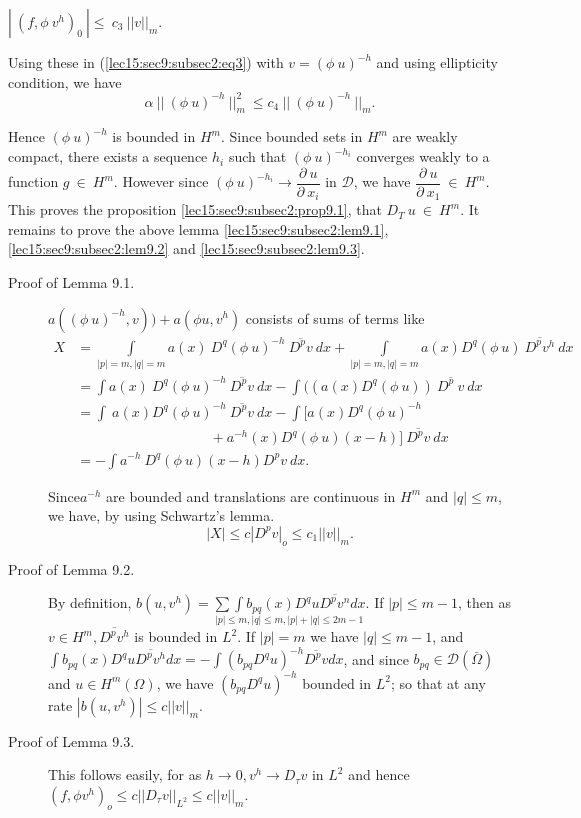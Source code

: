 \begin{lemma}\label{lec15:sec9:subsec2:lem9.3}%
  $| ~ (f, \phi ~ v^h)_0 ~ |\leq ~ c_3 ~ || v ||_m$.
\end{lemma} 

 Using these in (\ref{lec15:sec9:subsec2:eq3}) with  $v = ( \phi ~ u)^{-h}$ and using
 ellipticity condition, we have 
 $$
 \alpha ~ || ~ (\phi ~ u)^{-h} ~ ||^2_m ~ \le c_4 ~ || ~ (\phi ~ u)^{-h} ~ ||_m.
 $$
 
Hence $(\phi ~ u)^{-h}$  is bounded in $H^m$. Since bounded sets in
$H^m$ are weakly compact, there exists a sequence $h_i$ such that
$(\phi ~ u)^{-h_i}$ converges weakly to a function $g ~ \in ~
H^m$. However since $(\phi ~ u)^{-h_i} \rightarrow \dfrac{\partial ~
  u}{ \partial ~ x_i}$ in $\mathscr{D}$, we have $\dfrac{\partial ~
  u}{\partial ~ x_1} ~ \in  ~ H^m$. This proves the
proposition \ref{lec15:sec9:subsec2:prop9.1}, that $D_T ~ u ~ \in ~ H^m$. It remains to
prove the above lemma \ref{lec15:sec9:subsec2:lem9.1}, \ref{lec15:sec9:subsec2:lem9.2} 
and \ref{lec15:sec9:subsec2:lem9.3}.   

\begin{description}
  \item [Proof of Lemma 9.1.]%
  $a((\phi ~ u)^{-h}, v)) + a(\phi u , v^h)$ consists of sums of terms like
  \begin{align*}
    X & = \int\limits_{|p|=m,|q|=m}a(x) ~ D^q(\phi ~ u)^{-h} ~
    \overline{D^p v} ~ dx + \int\limits_{|p| = m, |q| = m} a(x)D^q(\phi ~
    u) ~ \overline{D^p v^h} ~  dx\\ 
    & = \int a(x) ~ D^q(\phi ~ u)^{-h} ~ \overline{D^p v} ~ dx -
    \int((a(x)D^q (\phi ~ u)) ~ \overline{D^p ~ v} ~ dx\\  
    & = \int ~ a(x)D^q(\phi ~ u)^{-h} ~\overline{D^p v} ~ dx -
    \int[a(x)D^q(\phi ~ u)^{-h}\\ 
      & \hspace{4cm}+ a^{-h} (x) D^q (\phi ~ u)
      (x-h)]~\overline{D^p v} ~ dx\\ 
    & = - \int a^{-h} ~ D^q(\phi ~ u) (x-h) D^p v ~ dx.
  \end{align*}
  
  Since\pageoriginale $a^{-h}$ are bounded and translations are continuous in $H^m$
  and $|q| \leq m$, we have, by using Schwartz's lemma.  
  $$
  |X| \leq c|D^p v|_o \leq c_1||v||_m. 
  $$
\item [Proof of Lemma 9.2.]%
  By definition, $b(u, v^h) = {\underset{ |p| \leq m, |q| \leq m,
      |p|+|q| \leq 2m-1}{\sum \int b_{pq}(x) D^q u \overline{D^p v^n}
      dx}}$. If $|p| \leq m-1$, then as $v \in H^m,
  \overline{D^p v^h}$ is bounded in $L^2$. If $|p|=m$ we have $|q| \leq
  m-1$, and $\int b_{pq}(x) D^q u \overline{D^p v^h} dx = - \int (b_{pq}
    D^q u)^{-h} \overline{D^p v}dx$, and since $b_{pq} \in
  \mathscr{D}(\bar{\Omega})$ and $u \in H^m(\Omega)$, we have
  $(b_{pq} D^qu)^{-h}$ bounded in $L^2$; so that at any rate $|b(u,
  v^h)| \leq c||v||_m$.  

\item [Proof of Lemma 9.3.]%
  This follows easily, for as $h \to 0, v^h \to D_{\tau} v $ in $L^2$
  and hence $(f, \phi v^h)_o \leq c||D_{\tau} v||_{L^2} \leq c||v||_m$.  
\end{description}
